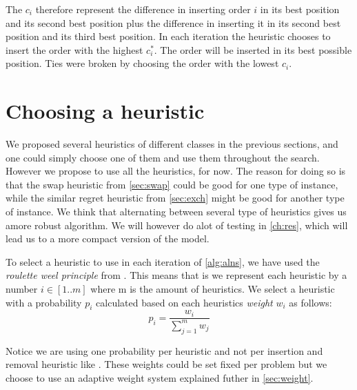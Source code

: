 \documentclass[../main.tex]{subfiles}
\begin{document}
The $c_i$ therefore represent the difference in inserting order $i$ in its best position and its second best position plus the difference in inserting it in its second best position and its third best position. In each iteration the heuristic chooses to insert the order with the highest $c^*_i$. The order will be inserted in its best possible position. Ties were broken by choosing the order with the lowest $c_i$.

\section{Choosing a heuristic}
\label{sec:choosing}
We proposed several heuristics of different classes in the previous sections, and one could simply choose one of them and use them throughout the search. 
However we propose to use all the heuristics, for now. 
The reason for doing so is that the swap heuristic from \cref{sec:swap} could be good for one type of instance, while the similar regret heuristic from \cref{sec:exch} might be good for another type of instance. 
We think that alternating between several type of heuristics gives us amore robust algorithm. 
We will however do alot of testing in \cref{ch:res}, which will lead us to a more compact version of the model. \par
To select a heuristic to use in each iteration of \cref{alg:alns}, we have used the \emph{roulette weel principle} from \cite{hemmati14}. 
This means that is we represent each heuristic by a number $i \in [1..m]$ where m is the amount of heuristics. 
We select a heuristic with a probability $p_i$ calculated based on each heuristics \textit{weight} $w_i$ as follows:
\begin{equation}\label{eq:weights}
    p_i=\dfrac{w_i}{\sum_{j=1}^m w_j}
\end{equation}

Notice we are using one probability per heuristic and not per insertion and removal heuristic like \cite{ropke06}. These weights could be set fixed per problem but we choose to use an adaptive weight system explained futher in \cref{sec:weight}.
\end{document}
